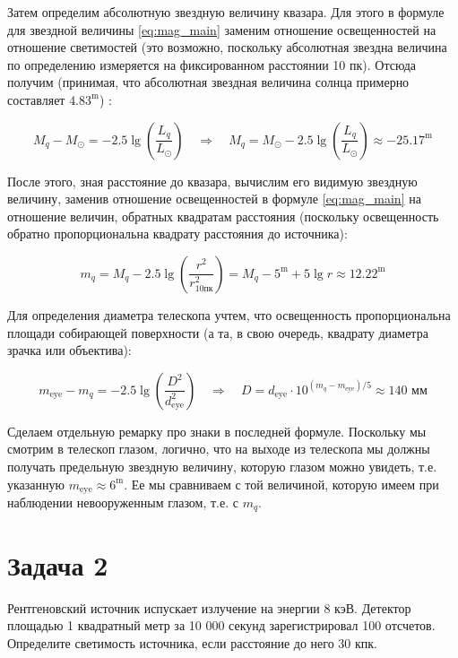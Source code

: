 \documentclass[a4paper, 12pt]{article}
\newcommand{\qrq}
{\ensuremath{\quad \Rightarrow \quad}} %
\begin{document}
Затем определим абсолютную звездную величину квазара. Для этого в формуле для звездной величины \ref{eq:mag_main} заменим отношение освещенностей на отношение светимостей (это возможно, поскольку абсолютная звездна величина по определению измеряется на фиксированном расстоянии 10 пк). Отсюда получим (принимая, что абсолютная звездная величина солнца примерно составляет $4.83^\text{m}$) :

\begin{equation}
	M_q - M_{\odot} = -2.5 \lg\left(\frac{L_q}{L_{\odot}}\right) \qrq M_q = M_{\odot} -2.5 \lg\left(\frac{L_q}{L_{\odot}}\right) \approx -25.17^\text{m}
\end{equation}

После этого, зная расстояние до квазара, вычислим его видимую звездную величину, заменив отношение освещенностей в формуле \ref{eq:mag_main} на отношение величин, обратных квадратам расстояния (поскольку освещенность обратно пропорциональна квадрату расстояния до источника):

\begin{equation}
	m_q = M_q - 2.5 \lg\left(\frac{r^2}{r^2_{10\text{пк}}}\right) = M_q - 5^\text{m} + 5\lg r \approx 12.22^\text{m}
\end{equation}

Для определения диаметра телескопа учтем, что освещенность пропорциональна площади собирающей поверхности (а та, в свою очередь, квадрату диаметра зрачка или объектива):

\begin{equation}
	m_{\text{eye}} - m_{q} = -2.5 \lg \left(\frac{D^2}{d_{\text{eye}}^2}\right) \qrq D = d_{\text{eye}} \cdot 10^{(m_q - m_{\text{eye}}) / 5} \approx \boxed{140 \text{ мм}}
\end{equation}

Сделаем отдельную ремарку про знаки в последней формуле. Поскольку мы смотрим в телескоп глазом, логично, что на выходе из телескопа мы должны получать предельную звездную величину, которую глазом можно увидеть, т.е. указанную $m_{\text{eye}} \approx 6^{\text{m}}$. Ее мы сравниваем с той величиной, которую имеем при наблюдении невооруженным глазом, т.е. с $m_q$.

\newpage

\section*{Задача 2}

Рентгеновский источник испускает излучение на энергии 8 кэВ. Детектор площадью 1 квадратный метр за 10 000 секунд зарегистрировал 100 отсчетов. Определите светимость источника, если расстояние до него 30 кпк.
\end{document}
